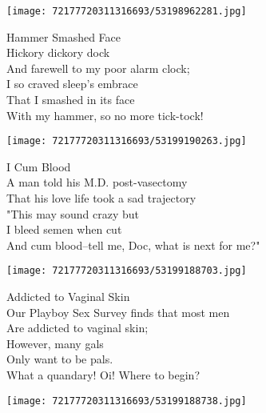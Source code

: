 \documentclass[10pt,letterpaper]{article}
\begin{document}
\begin{center}\texttt{[image: 72177720311316693/53198962281.jpg]}
\end{center}
\begin{center}
Hammer Smashed Face\\
\vskip 0.2in
Hickory dickory dock\\
And farewell to my poor alarm clock;\\
I so craved sleep's embrace\\
That I smashed in its face\\
With my hammer, so no more tick-tock!\\
\end{center}
\pagebreak

\begin{center}
\texttt{[image: 72177720311316693/53199190263.jpg]}
\end{center}

\begin{center}
I Cum Blood\\
\vskip 0.2in
A man told his M.D. post-vasectomy\\
That his love life took a sad trajectory\\
"This may sound crazy but\\
I bleed semen when cut\\
And cum blood--tell me, Doc, what is next for me?"\\
\end{center}
\pagebreak

\begin{center}
\texttt{[image: 72177720311316693/53199188703.jpg]}
\end{center}

\begin{center}
Addicted to Vaginal Skin\\
\vskip 0.2in
Our Playboy Sex Survey finds that most men\\
Are addicted to vaginal skin;\\
However, many gals\\
Only want to be pals.\\
What a quandary!  Oi!  Where to begin?\\
\end{center}
\pagebreak

\begin{center}
\texttt{[image: 72177720311316693/53199188738.jpg]}
\end{center}
\end{document}
